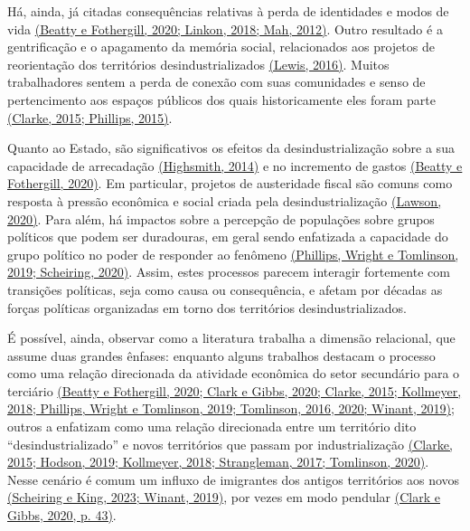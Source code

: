 Há, ainda, já citadas consequências relativas à perda de identidades e
modos de vida \href{https://www.zotero.org/google-docs/?NKeJWc}{(Beatty
e Fothergill, 2020; Linkon, 2018; Mah, 2012)}. Outro resultado é a
gentrificação e o apagamento da memória social, relacionados aos
projetos de reorientação dos territórios desindustrializados
\href{https://www.zotero.org/google-docs/?3ItOId}{(Lewis, 2016)}. Muitos
trabalhadores sentem a perda de conexão com suas comunidades e senso de
pertencimento aos espaços públicos dos quais historicamente eles foram
parte \href{https://www.zotero.org/google-docs/?pQ8ete}{(Clarke, 2015;
Phillips, 2015)}.

Quanto ao Estado, são significativos os efeitos da desindustrialização
sobre a sua capacidade de arrecadação
\href{https://www.zotero.org/google-docs/?VRyXI9}{(Highsmith, 2014)} e
no incremento de gastos
\href{https://www.zotero.org/google-docs/?Dx7U8x}{(Beatty e Fothergill,
2020)}. Em particular, projetos de austeridade fiscal são comuns como
resposta à pressão econômica e social criada pela desindustrialização
\href{https://www.zotero.org/google-docs/?UQbXO1}{(Lawson, 2020)}. Para
além, há impactos sobre a percepção de populações sobre grupos políticos
que podem ser duradouras, em geral sendo enfatizada a capacidade do
grupo político no poder de responder ao fenômeno
\href{https://www.zotero.org/google-docs/?Hd7A5i}{(Phillips, Wright e
Tomlinson, 2019; Scheiring, 2020)}. Assim, estes processos parecem
interagir fortemente com transições políticas, seja como causa ou
consequência, e afetam por décadas as forças políticas organizadas em
torno dos territórios desindustrializados.

É possível, ainda, observar como a literatura trabalha a dimensão
relacional, que assume duas grandes ênfases: enquanto alguns trabalhos
destacam o processo como uma relação direcionada da atividade econômica
do setor secundário para o terciário
\href{https://www.zotero.org/google-docs/?g4rsPO}{(Beatty e Fothergill,
2020; Clark e Gibbs, 2020; Clarke, 2015; Kollmeyer, 2018; Phillips,
Wright e Tomlinson, 2019; Tomlinson, 2016, 2020; Winant, 2019)}; outros
a enfatizam como uma relação direcionada entre um território dito
``desindustrializado'' e novos territórios que passam por
industrialização
\href{https://www.zotero.org/google-docs/?QosUuZ}{(Clarke, 2015; Hodson,
2019; Kollmeyer, 2018; Strangleman, 2017; Tomlinson, 2020)}. Nesse
cenário é comum um influxo de imigrantes dos antigos territórios aos
novos \href{https://www.zotero.org/google-docs/?Efn8gu}{(Scheiring e
King, 2023; Winant, 2019)}, por vezes em modo pendular
\href{https://www.zotero.org/google-docs/?UOGMrF}{(Clark e Gibbs, 2020,
p. 43)}.

